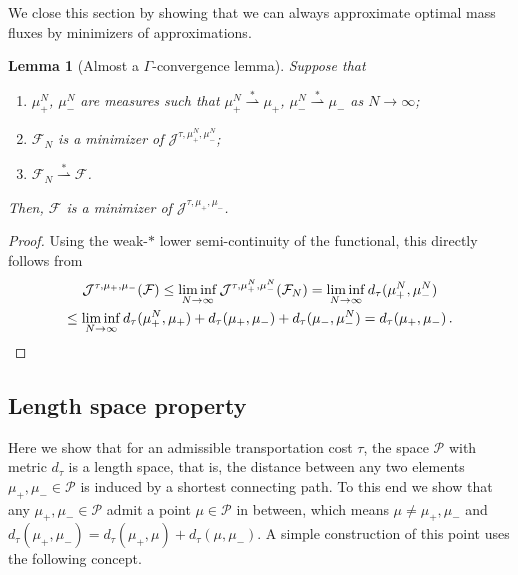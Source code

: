 \documentclass[10pt,a4paper,oneside,final]{article}
\newcommand{\prob}{{\mathcal{P}}}
\newcommand{\weakstarto}{\stackrel{*}{\rightharpoonup}}
\newcommand{\flux}{{\mathcal{F}}}
\newcommand{\JEn}{{\mathcal{J}}}
\newcommand{\dtau}{d_\tau}
\newcommand{\transportPaths}{mass fluxes}
\numberwithin{equation}{section}
\theoremstyle{plain}
\newtheorem{lemma}[theorem]{Lemma}
\theoremstyle{definition}
\theoremstyle{remark}
\newcommand{\notinclude}[1]{}
\begin{document}
{We close this section by showing that we can always approximate optimal \transportPaths{} by minimizers of approximations.

\begin{lemma}[Almost a $\Gamma$-convergence lemma]\label{lem:gamma_convergence_for_discrete_measures}
Suppose that
\begin{enumerate}
 \item $\mu_+^N$, $\mu_-^N$ are measures such that $\mu_+^N \weakstarto \mu_+$, $\mu_-^N \weakstarto \mu_-$ as $N\to\infty$;
 \item $\flux_N$ is a minimizer of $\JEn^{\tau,\mu_+^N,\mu_-^N}$;
 \item $\flux_N \weakstarto \flux$.
\end{enumerate}
Then, $\flux$ is a minimizer of $\JEn^{\tau,\mu_+,\mu_-}$.
\end{lemma}

\begin{proof}
Using the weak-$*$ lower semi-continuity of the functional, this directly follows from
\begin{multline*}
 \JEn^{\tau,\mu_+,\mu_-}(\flux)
 \leq \liminf_{N \to \infty} \JEn^{\tau,\mu_+^N,\mu_-^N}(\flux_N)
 = \liminf_{N \to \infty} \dtau(\mu_+^N,\mu_-^N)\\
 \leq\liminf_{N \to \infty} \dtau(\mu_+^N,\mu_+)+\dtau(\mu_+,\mu_-)+\dtau(\mu_-,\mu_-^N)
 =\dtau(\mu_+,\mu_-)\,.\qedhere
\end{multline*}
\end{proof}
}%


\subsection{Length space property}

Here we show that for an admissible transportation cost $\tau$, the space $\prob$ with metric $\dtau$ is a length space, that is, the distance between any two elements $\mu_+,\mu_-\in\prob$ is induced by a shortest connecting path.
To this end we show that any $\mu_+,\mu_-\in\prob$ admit a point $\mu\in\prob$ in between, which means $\mu\neq\mu_+,\mu_-$ and $\dtau(\mu_+,\mu_-)=\dtau(\mu_+,\mu)+\dtau(\mu,\mu_-)$.
A simple construction of this point uses the following concept.
\end{document}
